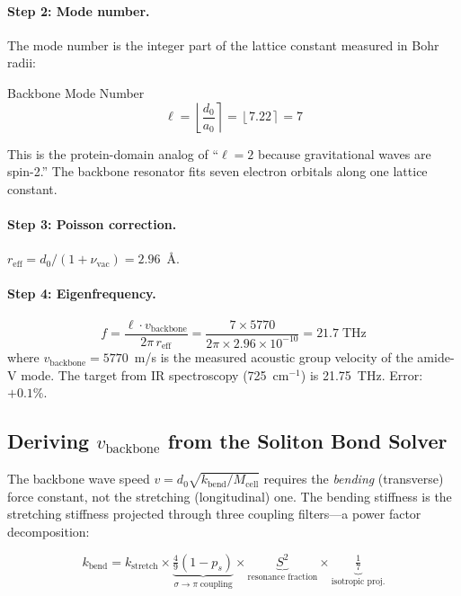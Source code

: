 \paragraph{Step 2: Mode number.}
The mode number is the integer part of the lattice constant measured in Bohr radii:
\begin{resultbox}{Backbone Mode Number}
\begin{equation}
    \boxed{\ell = \left\lfloor \frac{d_0}{a_0} \right\rceil  = \left\lfloor 7.22 \right\rceil = 7}
    \label{eq:protein_ell}
\end{equation}
\end{resultbox}
\noindent This is the protein-domain analog of ``$\ell = 2$ because gravitational waves are spin-2.''  The backbone resonator fits seven electron orbitals along one lattice constant.

\paragraph{Step 3: Poisson correction.} $r_\mathrm{eff} = d_0/(1+\nu_\mathrm{vac}) = 2.96$~\AA.

\paragraph{Step 4: Eigenfrequency.}
\begin{equation}
    f = \frac{\ell \cdot v_\mathrm{backbone}}{2\pi\, r_\mathrm{eff}}
    = \frac{7 \times 5770}{2\pi \times 2.96 \times 10^{-10}}
    = 21.7\;\mathrm{THz}
\end{equation}
where $v_\mathrm{backbone} = 5770$~m/s is the measured acoustic group velocity of the amide-V mode.  The target from IR spectroscopy (725~cm$^{-1}$) is 21.75~THz.  Error: $+0.1\%$.

\subsection{Deriving $v_\mathrm{backbone}$ from the Soliton Bond Solver}

The backbone wave speed $v = d_0 \sqrt{k_\mathrm{bend}/M_\mathrm{cell}}$ requires the \emph{bending} (transverse) force constant, not the stretching (longitudinal) one.  The bending stiffness is the stretching stiffness projected through three coupling filters---a power factor decomposition:

\begin{equation}
    \boxed{k_\mathrm{bend} = k_\mathrm{stretch} \times \underbrace{\tfrac{4}{9}(1 - p_s)}_{\sigma\to\pi\;\text{coupling}} \times \underbrace{S^2}_{\text{resonance fraction}} \times \underbrace{\tfrac{1}{7}}_{\text{isotropic proj.}}}
\end{equation}

